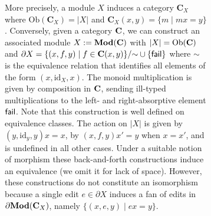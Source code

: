 \begin{figure}
\begin{figure}
More precisely, a module $X$ induces a category $\mathbf{C}_X$
where $\text{Ob}(\mathbf{C}_X) = |X|$ and
$\mathbf{C}_X(x,y)=\{m\mid mx=y\}$.  
%
Conversely, given a category $\mathbf{C}$, we can construct an associated module
$X:=\mathbf{Mod}(\mathbf{C})$ with $|X|=\text{Ob}(\mathbf{C})$ and $\partial X=\{(x,f,y)\mid
f\in\mathbf{C}(x,y)\} /\mathord{\sim}\cup\{\mathsf{fail}\}$ where $\sim$ is the equivalence
relation that identifies all elements of the form
$(x,\text{id}_X,x)$. The monoid multiplication is given by composition
in $\mathbf{C}$, sending ill-typed multiplications to the left- and
right-absorptive element $\mathsf{fail}$.
%
Note that this construction is well defined on equivalence classes. The
action on $|X|$ is given by $(y,\text{id}_y,y)x=x$, by $(x,f,y)x'=y$ when
$x=x'$, and is undefined in all other cases.  Under a suitable notion of
morphism these back-and-forth constructions induce an equivalence (we omit
it for lack of space). However, these constructions do not constitute an
isomorphism because a single edit $e\in \partial X$ induces a fan of edits
in $\partial \mathbf{Mod}(\mathbf{C}_X)$, namely $\{(x,e,y)\mid ex=y\}$.

\fi%
\fi%

\ifdissertation

\end{figure}
\end{figure}
